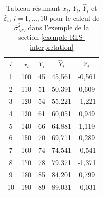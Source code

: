 \begin{table}[h!]
\caption{Tableau résumant $x_i$, $Y_i$, $\hat Y_i$ et $\widehat\varepsilon_i$, $i=1,\dots,10$ pour le calcul de $\widehat\sigma^2_{MV}$ dans l'exemple de la section \ref{exemple-RLS-interpretation}}
\label{tab:cal_sigma2_exp} \centering
\begin{tabular}{c|cccc}
$i$ & $x_i$& $Y_i$ & $\hat Y_i$ & $\widehat\varepsilon_i$ \\ \hline
1 & 100 & 45 & 45,561 &  -0,561 \\
2 & 110  & 51  & 50,391 & 0,609 \\
3 &  120 & 54  & 55,221 & -1,221 \\
4 & 130  & 61 & 60,051 & 0,949\\
5 & 140 & 66  & 64,881  &  1,119 \\
6 & 150  & 70 & 69,711  & 0,289\\
7 &160  & 74 & 74,541 & -0,541\\
8 & 170  & 78 & 79,371 & -1,371\\
9 & 180 & 85 & 84,201 & 0,799\\
10 & 190  & 89 & 89,031 & -0,031
\end{tabular}
\end{table}